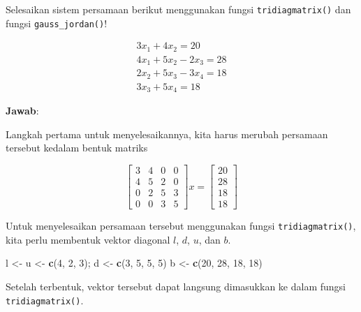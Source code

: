 \documentclass[]{book}
\newenvironment{Shaded}{\begin{snugshade}}{\end{snugshade}}
\newcommand{\DecValTok}[1]{\textcolor[rgb]{0.00,0.00,0.81}{#1}}
\newcommand{\KeywordTok}[1]{\textcolor[rgb]{0.13,0.29,0.53}{\textbf{#1}}}
\newcommand{\NormalTok}[1]{#1}
\newcommand{\StringTok}[1]{\textcolor[rgb]{0.31,0.60,0.02}{#1}}
\theoremstyle{definition}
\theoremstyle{definition}
\theoremstyle{definition}
\theoremstyle{remark}
\let\BeginKnitrBlock\begin \let\EndKnitrBlock\end
\begin{document}
\BeginKnitrBlock{example}
\protect\hypertarget{exm:tridiagexm}{}{\label{exm:tridiagexm} }Selesaikan sistem persamaan berikut menggunakan fungsi \texttt{tridiagmatrix()} dan fungsi \texttt{gauss\_jordan()}!
\EndKnitrBlock{example}

\[
\begin{matrix}
  3x_1+4x_2=20 \\
  4x_1+5x_2-2x_3=28 \\
  2x_2+5x_3-3x_4=18 \\
  3x_3+5x_4=18
\end{matrix}
\]

\textbf{Jawab}:

Langkah pertama untuk menyelesaikannya, kita harus merubah persamaan tersebut kedalam bentuk matriks

\begin{equation*}
\begin{bmatrix}
     3 & 4 & 0  & 0     \\[0.3em]
     4 & 5 & 2 & 0     \\[0.3em]
     0 & 2 & 5 & 3     \\[0.3em]
     0 & 0 & 3 & 5
\end{bmatrix}
x = \begin{bmatrix}
     20     \\[0.3em]
     28     \\[0.3em]
     18     \\[0.3em]
     18
\end{bmatrix}
\end{equation*}

Untuk menyelesaikan persamaan tersebut menggunakan fungsi \texttt{tridiagmatrix()}, kita perlu membentuk vektor diagonal \(l\), \(d\), \(u\), dan \(b\).

\begin{Shaded}
\begin{Highlighting}[]
\NormalTok{l <-}\StringTok{ }\NormalTok{u <-}\StringTok{ }\KeywordTok{c}\NormalTok{(}\DecValTok{4}\NormalTok{, }\DecValTok{2}\NormalTok{, }\DecValTok{3}\NormalTok{); d <-}\StringTok{ }\KeywordTok{c}\NormalTok{(}\DecValTok{3}\NormalTok{, }\DecValTok{5}\NormalTok{, }\DecValTok{5}\NormalTok{, }\DecValTok{5}\NormalTok{)}
\NormalTok{b <-}\StringTok{ }\KeywordTok{c}\NormalTok{(}\DecValTok{20}\NormalTok{, }\DecValTok{28}\NormalTok{, }\DecValTok{18}\NormalTok{, }\DecValTok{18}\NormalTok{)}
\end{Highlighting}
\end{Shaded}

Setelah terbentuk, vektor tersebut dapat langsung dimasukkan ke dalam fungsi \texttt{tridiagmatrix()}.
\end{document}
